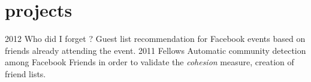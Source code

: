 \documentclass[]{friggeri-cv}
\begin{document}
\section{projects}

\begin{entrylist}
  \entry
    {2012}
    {Who did I forget ?}
    {\href{ }{ }}
    {Guest list recommendation for Facebook events based on friends already attending the event.}
  \entry
    {2011}
    {Fellows}
    {\href{ }{ }}
    {Automatic community detection among Facebook Friends in order to validate the \emph{cohesion} measure, creation of friend lists.}
\end{entrylist}



%
\end{document}
